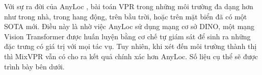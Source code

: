 Với sự ra đời của AnyLoc \cite{keetha2023anyloc}, bài toán VPR trong những môi trường đa dạng hơn như trong nhà, trong hang động, trên bầu trời, hoặc trên mặt biển đã có một SOTA mới. Điều này là nhờ việc AnyLoc sử dụng mạng cơ sở DINO, một mạng Vision Transformer được huấn luyện bằng cơ chế tự giám sát để sinh ra những đặc trưng có giá trị với mọi tác vụ. Tuy nhiên, khi xét đến môi trường thành thị thì MixVPR vẫn có cho ra kết quả chính xác hơn AnyLoc. Số liệu cụ thể sẽ được trình bày bên dưới.


